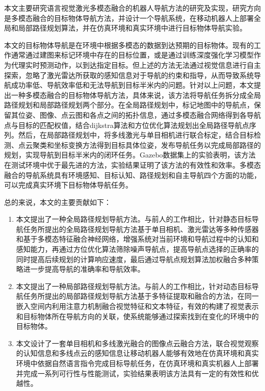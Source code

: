 	本文主要研究语言视觉激光多模态融合的机器人导航方法的研究及实现，研究方向是多模态融合的目标物体导航方法，并设计一个导航系统，在移动机器人上部署全局和局部路径规划算法，并在仿真环境和真实环境中进行目标物体导航实验。
	
	本文的目标物体导航是在环境中根据多模态的数据到达预期的目标物体。现有的工作通常通过建图来标记环境中存在的目标位置，或是通过训练深度强化学习模型作为代理实时预测动作，以到达指定目标。但上述的方法无法通过视觉信息进行自主探索，忽略了激光雷达所获取的感知信息对于导航的约束和指导，从而导致系统导航成功率低、导航效率低和无法导航到目标半米内的问题。针对以上问题，本文提出一种多模态融合的目标物体导航方法，具体来说，该方法将导航任务拆分成全局路径规划和局部路径规划两个部分。在全局路径规划中，标记地图中的导航点，保留其位姿、图像、点云图和各点之间的拓扑信息，通过多模态融合网络得到各导航点与目标的匹配权值，结合dijkstra算法和方位优化算法规划出全局路径导航点序列。然后，在局部路径规划中，将多线激光与单目相机进行联合标定，结合目标检测、点云聚类和坐标变换方法得到目标具体位姿，发布导航任务以完成局部路径的规划，实现导航到目标半米内的闭环任务。Gazebo数据集上的实验表明，该方法在测试环境中优于最先进的方法，实验结果证明了该方法的有效性和效率。多模态融合的导航系统具有环境感知、目标认知、路径规划和自主导航四个方面的功能，可以完成真实环境下目标物体导航任务。

	总的来说，本文的主要贡献如下：
	\begin{enumerate}[topsep = 0 pt, itemsep= 0 pt, parsep=0pt, partopsep=0pt, leftmargin=44pt, itemindent=0pt, labelsep=6pt, label=(\arabic*)]
		\item 	本文提出了一种全局路径规划导航方法。与前人的工作相比，针对静态目标导航任务所提出的全局路径规划导航方法基于单目相机、激光雷达等多种传感器和基于多模态特征融合神经网络，增强系统对当前环境和导航过程中的认知和感知能力，再通过方位优化算法筛除噪声导航点，提高导航点选择的正确率的同时提高后续规划的计算响应速度，最后通过导航点规划算法加权融合多种策略进一步提高导航的准确率和导航效率。
		\item	本文提出了一种局部路径规划导航方法。与前人的工作相比，针对动态目标导航任务所提出的局部路径规划导航方法基于多特征提取和融合的方法，在同一嵌入空间内利用注意力机制融合视觉特征和文本特征，有效的构建了视觉表示和目标物体所在导航方向的关联，使系统能够通过探索找到在变化的环境中的目标物体。
		\item	本文设计了一套单目相机和多线激光融合的图像点云融合方法，联合视觉观察的认知信息和多线点云的感知信息让移动机器人能够有效地在仿真环境和真实环境中依据自然语言指令完成目标导航任务，在仿真环境和真实机器人上部署并完成一系列可行性与性能测试，实验结果表明该方法具有一定的有效性和优越性。
	\end{enumerate}

